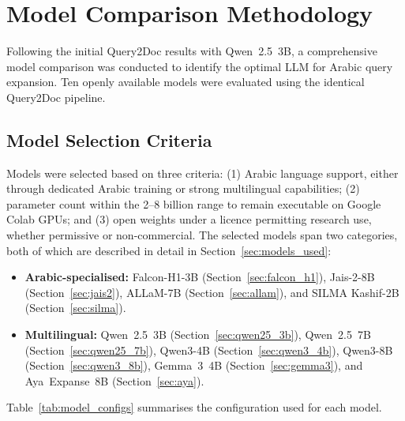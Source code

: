 \section{Model Comparison Methodology}
\label{sec:meth_model_comparison}

Following the initial Query2Doc results with Qwen~2.5~3B, a comprehensive model comparison was conducted to identify the optimal LLM for Arabic query expansion. Ten openly available models were evaluated using the identical Query2Doc pipeline.

\subsection{Model Selection Criteria}
\label{sec:meth_model_selection}

Models were selected based on three criteria: (1) Arabic language support, either through dedicated Arabic training or strong multilingual capabilities; (2) parameter count within the 2--8 billion range to remain executable on Google Colab GPUs; and (3) open weights under a licence permitting research use, whether permissive or non-commercial. The selected models span two categories, both of which are described in detail in Section~\ref{sec:models_used}:

\begin{itemize}
    \item \textbf{Arabic-specialised:} Falcon-H1-3B (Section~\ref{sec:falcon_h1}), Jais-2-8B (Section~\ref{sec:jais2}), ALLaM-7B (Section~\ref{sec:allam}), and SILMA Kashif-2B (Section~\ref{sec:silma}).
    \item \textbf{Multilingual:} Qwen~2.5~3B (Section~\ref{sec:qwen25_3b}), Qwen~2.5~7B (Section~\ref{sec:qwen25_7b}), Qwen3-4B (Section~\ref{sec:qwen3_4b}), Qwen3-8B (Section~\ref{sec:qwen3_8b}), Gemma~3~4B (Section~\ref{sec:gemma3}), and Aya~Expanse~8B (Section~\ref{sec:aya}).
\end{itemize}

Table~\ref{tab:model_configs} summarises the configuration used for each model.

